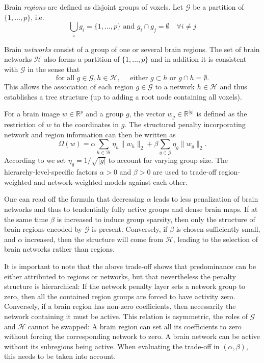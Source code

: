 \documentclass{article}
\newcommand{\R}{\mathbb{R}}
\begin{document}
Brain \textit{regions} are defined as disjoint groups of voxels. Let \(\mathcal G\)
be a partition of \(\{1, \dots, p\}\), i.e.
\[  \bigcup_{i} g_i = \{1, \dots, p\} \textrm{ and } g_i\cap g_j=\emptyset
\quad\forall i\not=j\]

Brain \textit{networks} consist of a group of one or several brain regions.
The set of brain networks \(\mathcal{H}\) also forms a partition of 
\(\{1, \dots, p\}\) and in addition it is consistent with \(\mathcal G\) in
the sense that
\[\textrm{for all }g\in\mathcal G, h\in\mathcal H,\quad
\textrm{ either } g\subset h\textrm{ or }g\cap h = \emptyset.\]
This allows the association of each region \(g\in\mathcal G\) to a 
network \(h\in\mathcal H\) and thus establishes a tree structure (up to 
adding a root node containing all voxels).

For a brain image \(w\in\R^p\) and a group \(g\), the vector 
\(w_g\in\R^{|g|}\) is defined as the restriction of \(w\) to the coordinates
 in \(g\). The structured penalty incorporating network
and region information can then be written as
\[\Omega(w) = \alpha\sum_{h\in\mathcal H}\eta_h\|w_h\|_2 + \beta\sum_{g\in\mathcal G}\eta_g\|w_g\|_2.\]
According to \cite{yuan2006model} we set \(\eta_g = 1/\sqrt{|g|}\) to
account for varying group size. The hierarchy-level-specific factors 
\(\alpha > 0\) and \(\beta > 0\) are used to trade-off region-weighted and
network-weighted models against each other.

One can read off the formula that decreasing \(\alpha\) leads to less 
penalization of brain networks and thus to tendentially fully active groups
and dense brain maps. If at the same time \(\beta\) is increased to 
induce group sparsity, then only the structure of brain regions encoded
by \(\mathcal G\) is present. Conversely, if \(\beta\) is chosen 
sufficiently small, and \(\alpha\) increased,
then the structure will come from \(\mathcal H\), leading to the
selection of brain networks rather than regions.

It is important to note that the above trade-off shows that predominance
can be either attributed to regions or networks, but that nevertheless the
penalty structure is hierarchical: If the network penalty layer sets a
network group to zero, then all the contained region groups are forced to
have activity zero. Conversely, if a brain region has non-zero coefficients,
then necessarily the network containing it must be active.
This relation is asymmetric, the roles of \(\mathcal G\) and \(\mathcal H\) 
cannot be swapped: A brain 
region can set all its coefficients to zero without forcing the 
corresponding network to zero. A brain network can be active without its
subregions being active.
When evaluating the trade-off in \((\alpha, \beta)\), this needs to be taken
into account.
\end{document}
